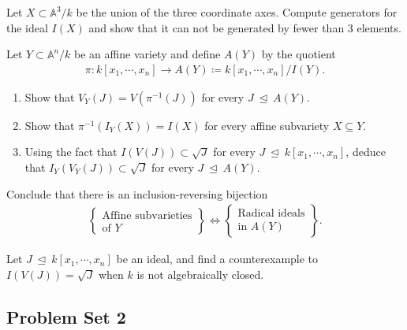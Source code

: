 \begin{exercise}[Gathmann 1.22]

Let \(X\subset {\mathbb{A}}^3/k\) be the union of the three coordinate
axes. Compute generators for the ideal \(I(X)\) and show that it can not
be generated by fewer than 3 elements.

\end{exercise}

\begin{exercise}

Let \(Y\subset {\mathbb{A}}^n/k\) be an affine variety and define
\(A(Y)\) by the quotient
\begin{align*}  
\pi: k[x_1,\cdots, x_n] \to A(Y) \coloneqq k[x_1, \cdots, x_n]/I(Y)
.\end{align*}

\begin{enumerate}
\def\labelenumi{\alph{enumi}.}
\item
  Show that \(V_Y(J) = V(\pi^{-1}(J))\) for every
  \(J{~\trianglelefteq~}A(Y)\).
\item
  Show that \(\pi^{-1} (I_Y(X)) = I(X)\) for every affine subvariety
  \(X\subseteq Y\).
\item
  Using the fact that \(I(V(J)) \subset \sqrt{J}\) for every
  \(J{~\trianglelefteq~}k[x_1, \cdots, x_n]\), deduce that
  \(I_Y(V_Y(J)) \subset \sqrt{J}\) for every
  \(J{~\trianglelefteq~}A(Y)\).
\end{enumerate}

Conclude that there is an inclusion-reversing bijection
\begin{align*}  
  \left\{{\substack{\text{Affine subvarieties}\\ \text{of } Y}}\right\} \iff \left\{{\substack{\text{Radical ideals} \\ \text{in } A(Y)}}\right\}
  .\end{align*}

\end{exercise}

\begin{exercise}[Extra]

Let \(J {~\trianglelefteq~}k[x_1, \cdots, x_n]\) be an ideal, and find a
counterexample to \(I(V(J)) =\sqrt{J}\) when \(k\) is not algebraically
closed.

\end{exercise}

\hypertarget{problem-set-2}{%
\subsection{Problem Set 2}\label{problem-set-2}}


